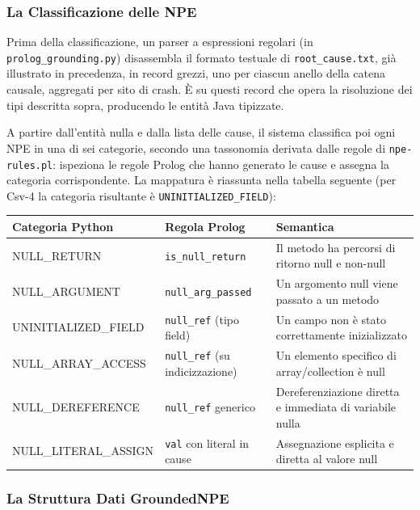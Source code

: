 \subsubsection{La Classificazione delle NPE}

Prima della classificazione, un parser a espressioni regolari (in \texttt{prolog\_grounding.py}) disassembla il
formato testuale di \texttt{root\_cause.txt}, già illustrato in precedenza, in record grezzi, uno per ciascun
anello della catena causale, aggregati per sito di crash. È su questi record che opera la risoluzione dei tipi
descritta sopra, producendo le entità Java tipizzate.

A partire dall'entità nulla e dalla lista delle cause, il sistema classifica poi ogni NPE in una di sei
categorie, secondo una tassonomia derivata dalle regole di \texttt{npe-rules.pl}: ispeziona le regole Prolog che
hanno generato le cause e assegna la categoria corrispondente. La mappatura è riassunta nella tabella seguente
(per Csv-4 la categoria risultante è \texttt{UNINITIALIZED\_FIELD}):

\begin{table}[h]
\centering
\begin{tabular}{lp{4cm}p{5cm}}
\toprule
\textbf{Categoria Python} & \textbf{Regola Prolog} & \textbf{Semantica} \\
\midrule
NULL\_RETURN & \texttt{is\_null\_return} & Il metodo ha percorsi di ritorno null e non-null \\
NULL\_ARGUMENT & \texttt{null\_arg\_passed} & Un argomento null viene passato a un metodo \\
UNINITIALIZED\_FIELD & \texttt{null\_ref} (tipo field) & Un campo non è stato correttamente inizializzato \\
NULL\_ARRAY\_ACCESS & \texttt{null\_ref} (su indicizzazione) & Un elemento specifico di array/collection è null \\
NULL\_DEREFERENCE & \texttt{null\_ref} generico & Dereferenziazione diretta e immediata di variabile nulla \\
NULL\_LITERAL\_ASSIGN & \texttt{val} con literal in cause & Assegnazione esplicita e diretta al valore null \\
\bottomrule
\end{tabular}
\end{table}

\subsubsection{La Struttura Dati GroundedNPE}

